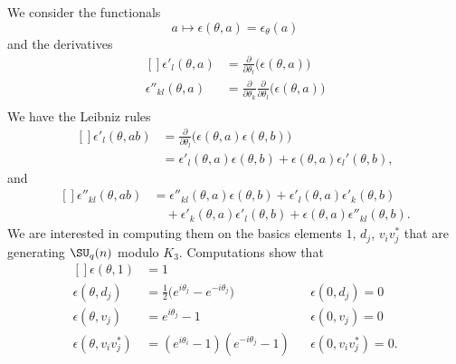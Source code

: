 We consider the functionals
\begin{equation}
	a\mapsto\epsilon(\theta,a)=\epsilon_{\theta}(a)
\end{equation}
and the derivatives
\begin{equation}
	\begin{aligned}[]
		\epsilon'_l(\theta,a)     & =\frac{ \partial  }{ \partial \theta_l }\big( \epsilon(\theta,a) \big)                                        \\
		\epsilon''_{kl}(\theta,a) & =\frac{ \partial  }{ \partial \theta_k }\frac{ \partial  }{ \partial \theta_l }\big( \epsilon(\theta,a) \big) \\
	\end{aligned}
\end{equation}
We have the Leibniz rules
\begin{equation}
	\begin{aligned}[]
		\epsilon'_l(\theta,ab) & =\frac{ \partial  }{ \partial \theta_l }\big( \epsilon(\theta,a)\epsilon(\theta,b) \big) \\
		                       & =\epsilon'_l(\theta,a)\epsilon(\theta,b)+\epsilon(\theta,a)\epsilon_l'(\theta,b),
	\end{aligned}
\end{equation}
and
\begin{equation}        \label{EqLeibnizepsppkl}
	\begin{aligned}[]
		\epsilon''_{kl}(\theta,ab) & =\epsilon''_{kl}(\theta,a)\epsilon(\theta,b)+\epsilon'_l(\theta,a)\epsilon'_k(\theta,b)       \\
		                           & \quad+\epsilon'_k(\theta,a)\epsilon'_l(\theta,b)+\epsilon(\theta,a)\epsilon''_{kl}(\theta,b).
	\end{aligned}
\end{equation}
We are interested in computing them on the basics elements $1$, $d_j$, $v_iv_j^*$ that are generating $\SU_q(n)$ modulo $K_3$. Computations show that
\begin{equation}
	\begin{aligned}[]
		\epsilon(\theta,1)        & =1                                                                                    \\
		\epsilon(\theta,d_j)      & =\frac{ 1 }{2}\big(  e^{i\theta_j}- e^{-i\theta_j} \big) &  & \epsilon(0,d_j)=0       \\
		\epsilon(\theta,v_j)      & = e^{i\theta_j}-1                                        &  & \epsilon(0,v_j)=0       \\
		\epsilon(\theta,v_iv_j^*) & =( e^{i\theta_i}-1)( e^{-i\theta_j}-1)                   &  & \epsilon(0,v_iv_j^*)=0.
	\end{aligned}
\end{equation}
